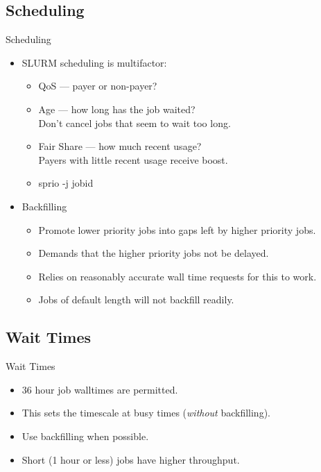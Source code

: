 \subsection{Scheduling}
\begin{frame}{Scheduling}
\begin{itemize}
\item{SLURM scheduling is multifactor:}
  \pause
\begin{itemize}
\item{\alert{QoS} --- payer or non-payer?}
  \pause
\item{\alert{Age} --- how long has the job waited?\hfill\\\qquad
  \alert{Don't cancel jobs that seem to wait too long.}}
  \pause
\item{\alert{Fair Share} --- how much recent usage?\hfill\\\qquad
  \alert{Payers with little recent usage receive boost.}}
  \pause
\item{\alert{sprio -j jobid}}
\end{itemize}
\pause
\item{\alert{Backfilling}}
\begin{itemize}
  \item{Promote lower priority jobs into gaps left by higher priority jobs.}
    \item{Demands that the higher priority jobs not be delayed.}
    \item{Relies on reasonably accurate wall time requests for this to work.}
      \item{Jobs of default length will not backfill readily.}
\end{itemize}
\end{itemize}
\end{frame}

\subsection{Wait Times}
\begin{frame}{Wait Times}
  \begin{itemize}
  \item{36 hour job walltimes are permitted.}
    \pause
  \item{\alert{This sets the timescale at busy times (\emph{without} backfilling).}}
    \pause
  \item{Use backfilling when possible.}
  \item{Short (1 hour or less) jobs have higher throughput.}
\end{itemize}
\end{frame}

